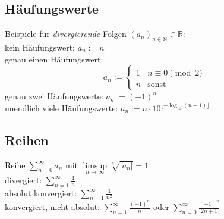 \documentclass[10pt,a4paper^, twocolumn]{article}
\newcommand{\R}{\mathbb{R}}
\newcommand{\N}{\mathbb{N}}
\begin{document}
	\subsection{Häufungswerte}
	Beispiele für \emph{divergierende} Folgen $(a_n)_{n \in \N} \in \R$:\\
	kein Häufungswert: $a_n:= n$\\
	genau einen Häufungswert:
	$$a_n := \begin{cases} 1 & n \equiv 0 \pmod{2} \\ n & \text{sonst} \end{cases} $$
	genau zwei Häufungswerte: $a_n := (-1)^n$\\
	unendlich viele Häufungswerte: $a_n := n \cdot 10^{\lfloor- \log_{10}(n+1) \rfloor}$

\subsection{Reihen}
Reihe $\sum \limits_{n=0}^\infty a_n$ mit $\limsup \limits_{n \to \infty} \sqrt[n]{|a_n|} = 1$ \\
divergiert: $ \sum \limits_{n=1}^\infty \frac{1}{n}$ \\
absolut konvergiert: $ \sum \limits_{n=1}^\infty \frac{1}{n^2}$ \\
konvergiert, nicht absolut: $\sum \limits_{n=1}^\infty \frac{(-1)^n}{n} $ oder $\sum \limits_{n=0}^\infty \frac{(-1)^n}{2n+1}$\\
\end{document}
